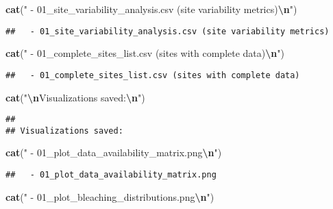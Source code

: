 \documentclass[
]{article}
\newenvironment{Shaded}{\begin{snugshade}}{\end{snugshade}}
\newcommand{\FunctionTok}[1]{\textcolor[rgb]{0.13,0.29,0.53}{\textbf{#1}}}
\newcommand{\NormalTok}[1]{#1}
\newcommand{\SpecialCharTok}[1]{\textcolor[rgb]{0.81,0.36,0.00}{\textbf{#1}}}
\newcommand{\StringTok}[1]{\textcolor[rgb]{0.31,0.60,0.02}{#1}}
\begin{document}
\begin{Shaded}
\begin{Highlighting}[]
\FunctionTok{cat}\NormalTok{(}\StringTok{"  {-} 01\_site\_variability\_analysis.csv (site variability metrics)}\SpecialCharTok{\textbackslash{}n}\StringTok{"}\NormalTok{)}
\end{Highlighting}
\end{Shaded}

\begin{verbatim}
##   - 01_site_variability_analysis.csv (site variability metrics)
\end{verbatim}

\begin{Shaded}
\begin{Highlighting}[]
\FunctionTok{cat}\NormalTok{(}\StringTok{"  {-} 01\_complete\_sites\_list.csv (sites with complete data)}\SpecialCharTok{\textbackslash{}n}\StringTok{"}\NormalTok{)}
\end{Highlighting}
\end{Shaded}

\begin{verbatim}
##   - 01_complete_sites_list.csv (sites with complete data)
\end{verbatim}

\begin{Shaded}
\begin{Highlighting}[]
\FunctionTok{cat}\NormalTok{(}\StringTok{"}\SpecialCharTok{\textbackslash{}n}\StringTok{Visualizations saved:}\SpecialCharTok{\textbackslash{}n}\StringTok{"}\NormalTok{)}
\end{Highlighting}
\end{Shaded}

\begin{verbatim}
## 
## Visualizations saved:
\end{verbatim}

\begin{Shaded}
\begin{Highlighting}[]
\FunctionTok{cat}\NormalTok{(}\StringTok{"  {-} 01\_plot\_data\_availability\_matrix.png}\SpecialCharTok{\textbackslash{}n}\StringTok{"}\NormalTok{)}
\end{Highlighting}
\end{Shaded}

\begin{verbatim}
##   - 01_plot_data_availability_matrix.png
\end{verbatim}

\begin{Shaded}
\begin{Highlighting}[]
\FunctionTok{cat}\NormalTok{(}\StringTok{"  {-} 01\_plot\_bleaching\_distributions.png}\SpecialCharTok{\textbackslash{}n}\StringTok{"}\NormalTok{) }
\end{Highlighting}
\end{Shaded}
\end{document}
